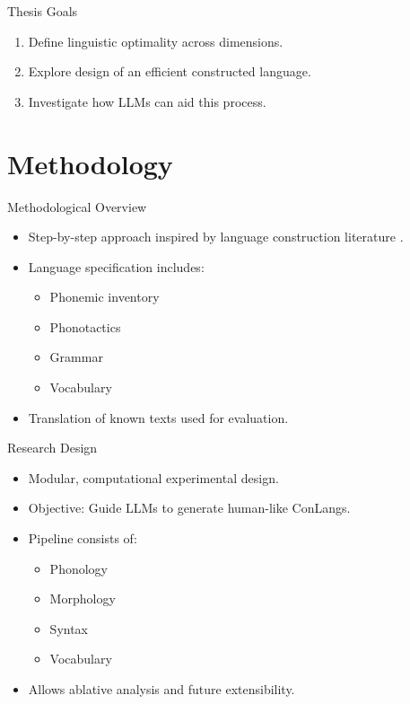 \documentclass{beamer}
\begin{document}
\begin{frame}{Thesis Goals}
	\begin{enumerate}
		\item Define linguistic optimality across dimensions.
		\item Explore design of an efficient constructed language.
		\item Investigate how LLMs can aid this process.
	\end{enumerate}
\end{frame}

\section{Methodology}

\begin{frame}{Methodological Overview}
	\begin{itemize}
		\item Step-by-step approach inspired by language construction literature \cite{petersonArtLanguageInvention2015,rosenfelder2010language}.
		\item Language specification includes:
		\begin{itemize}
			\item Phonemic inventory
			\item Phonotactics
			\item Grammar
			\item Vocabulary
		\end{itemize}
		\item Translation of known texts used for evaluation.
	\end{itemize}
\end{frame}

\begin{frame}{Research Design}
	\begin{itemize}
		\item Modular, computational experimental design.
		\item Objective: Guide LLMs to generate human-like ConLangs.
		\item Pipeline consists of:
		\begin{itemize}
			\item Phonology
			\item Morphology
			\item Syntax
			\item Vocabulary
		\end{itemize}
		\item Allows ablative analysis and future extensibility.
	\end{itemize}
\end{frame}
\end{document}
